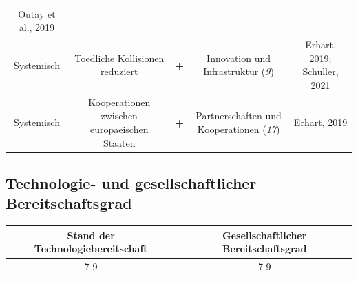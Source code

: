 \documentclass[
]{book}
\begin{document}
\begin{longtable}[]{@{}ccccc@{}}
\begin{minipage}[t]{0.17\columnwidth}
Outay et al., 2019\strut
\end{minipage}\tabularnewline
\begin{minipage}[t]{0.17\columnwidth}\centering
Systemisch\strut
\end{minipage} & \begin{minipage}[t]{0.16\columnwidth}\centering
Toedliche Kollisionen reduziert\strut
\end{minipage} & \begin{minipage}[t]{0.17\columnwidth}\centering
\textbf{+}\strut
\end{minipage} & \begin{minipage}[t]{0.17\columnwidth}\centering
Innovation und Infrastruktur (\emph{9})\strut
\end{minipage} & \begin{minipage}[t]{0.17\columnwidth}\centering
Erhart, 2019; Schuller, 2021\strut
\end{minipage}\tabularnewline
\begin{minipage}[t]{0.17\columnwidth}\centering
Systemisch\strut
\end{minipage} & \begin{minipage}[t]{0.16\columnwidth}\centering
Kooperationen zwischen europaeischen Staaten\strut
\end{minipage} & \begin{minipage}[t]{0.17\columnwidth}\centering
\textbf{+}\strut
\end{minipage} & \begin{minipage}[t]{0.17\columnwidth}\centering
Partnerschaften und Kooperationen (\emph{17})\strut
\end{minipage} & \begin{minipage}[t]{0.17\columnwidth}\centering
Erhart, 2019\strut
\end{minipage}\tabularnewline
\bottomrule
\end{longtable}

\hypertarget{technologie--und-gesellschaftlicher-bereitschaftsgrad-10}{%
\subsection*{Technologie- und gesellschaftlicher Bereitschaftsgrad}\label{technologie--und-gesellschaftlicher-bereitschaftsgrad-10}}

\begin{longtable}[]{@{}cc@{}}
\toprule
Stand der Technologiebereitschaft & Gesellschaftlicher Bereitschaftsgrad\tabularnewline
\midrule
\endhead
7-9 & 7-9\tabularnewline
\bottomrule
\end{longtable}
\end{document}
